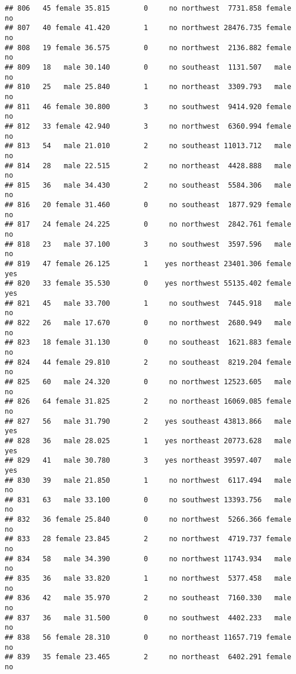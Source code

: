 \documentclass[
]{article}
\begin{document}
\begin{verbatim}
## 806   45 female 35.815        0     no northwest  7731.858 female       no
## 807   40 female 41.420        1     no northwest 28476.735 female       no
## 808   19 female 36.575        0     no northwest  2136.882 female       no
## 809   18   male 30.140        0     no southeast  1131.507   male       no
## 810   25   male 25.840        1     no northeast  3309.793   male       no
## 811   46 female 30.800        3     no southwest  9414.920 female       no
## 812   33 female 42.940        3     no northwest  6360.994 female       no
## 813   54   male 21.010        2     no southeast 11013.712   male       no
## 814   28   male 22.515        2     no northeast  4428.888   male       no
## 815   36   male 34.430        2     no southeast  5584.306   male       no
## 816   20 female 31.460        0     no southeast  1877.929 female       no
## 817   24 female 24.225        0     no northwest  2842.761 female       no
## 818   23   male 37.100        3     no southwest  3597.596   male       no
## 819   47 female 26.125        1    yes northeast 23401.306 female      yes
## 820   33 female 35.530        0    yes northwest 55135.402 female      yes
## 821   45   male 33.700        1     no southwest  7445.918   male       no
## 822   26   male 17.670        0     no northwest  2680.949   male       no
## 823   18 female 31.130        0     no southeast  1621.883 female       no
## 824   44 female 29.810        2     no southeast  8219.204 female       no
## 825   60   male 24.320        0     no northwest 12523.605   male       no
## 826   64 female 31.825        2     no northeast 16069.085 female       no
## 827   56   male 31.790        2    yes southeast 43813.866   male      yes
## 828   36   male 28.025        1    yes northeast 20773.628   male      yes
## 829   41   male 30.780        3    yes northeast 39597.407   male      yes
## 830   39   male 21.850        1     no northwest  6117.494   male       no
## 831   63   male 33.100        0     no southwest 13393.756   male       no
## 832   36 female 25.840        0     no northwest  5266.366 female       no
## 833   28 female 23.845        2     no northwest  4719.737 female       no
## 834   58   male 34.390        0     no northwest 11743.934   male       no
## 835   36   male 33.820        1     no northwest  5377.458   male       no
## 836   42   male 35.970        2     no southeast  7160.330   male       no
## 837   36   male 31.500        0     no southwest  4402.233   male       no
## 838   56 female 28.310        0     no northeast 11657.719 female       no
## 839   35 female 23.465        2     no northeast  6402.291 female       no

\end{verbatim}
\end{document}
